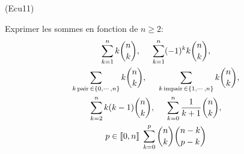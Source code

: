 \begin{tiny}(Ecu11)\end{tiny}
Exprimer les sommes en fonction de $n\geq2$:
\begin{multline*}
\sum_{k=1}^{n}k \binom{n}{k},\hspace{0.5cm} \sum_{k=1}^{n}(-1)^{k}k \binom{n}{k}, \\
\sum_{k \,\mathrm{ pair }\,\in \{ 0,\cdots ,n \}} k\binom{n}{k} ,\hspace{0.5cm} \sum _{k \,\mathrm{ impair }\,\in \{ 1,\cdots,n \}}k\binom{n}{k}, \\
\sum_{k=2}^{n}k(k-1) \binom{n}{k}, \hspace{0.5cm} \sum_{k=0}^{n}\frac{1}{k+1} \binom{n}{k}, \\
p\in \llbracket 0,n\rrbracket \;\sum_{k=0}^{p} \binom{n}{k} \binom{n-k}{p-k}
\end{multline*}
